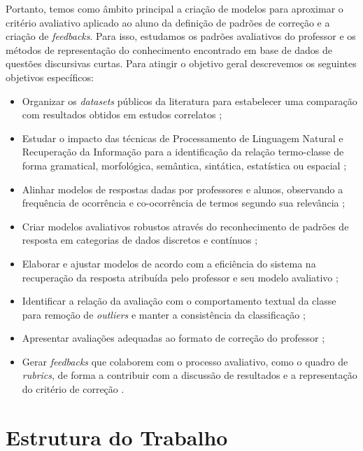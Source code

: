 Portanto, temos como âmbito principal a criação de modelos para aproximar o critério avaliativo aplicado ao aluno da definição de padrões de correção e a criação de \textit{feedbacks}. Para isso, estudamos os padrões avaliativos do professor e os métodos de representação do conhecimento encontrado em base de dados de questões discursivas curtas. Para atingir o objetivo geral descrevemos os seguintes objetivos específicos:

\begin{itemize}
\item Organizar os \textit{datasets} públicos da literatura para estabelecer uma comparação com resultados obtidos em estudos correlatos \cite{burrows2015};
\item Estudar o impacto das técnicas de Processamento de Linguagem Natural e Recuperação da Informação para a identificação da relação termo-classe de forma gramatical, morfológica, semântica, sintática, estatística ou espacial \cite{galhardi2018a, kumar2019, sahu2020};
\item Alinhar modelos de respostas dadas por professores e alunos, observando a frequência de ocorrência e co-ocorrência de termos segundo sua relevância \cite{jordan2012, saha2018, ding2020};
\item Criar modelos avaliativos robustos através do reconhecimento de padrões de resposta em categorias de dados discretos e contínuos \cite{butcher2010, heilman2015, burrows2015};
\item Elaborar e ajustar modelos de acordo com a eficiência do sistema na recuperação da resposta atribuída pelo professor e seu modelo avaliativo \cite{zesch2015, condor2020, pado2021};
\item Identificar a relação da avaliação com o comportamento textual da classe para remoção de \textit{outliers} e manter a consistência da classificação \cite{ding2020, filighera2020};
\item Apresentar avaliações adequadas ao formato de correção do professor \cite{higgins2014, funayama2020, pado2021};
\item Gerar \textit{feedbacks} que colaborem com o processo avaliativo, como o quadro de \textit{rubrics}, de forma a contribuir com a discussão de resultados e a representação do critério de correção \cite{marvaniya2018, mizumoto2019, suzen2020}.
\end{itemize}

\section{Estrutura do Trabalho}

